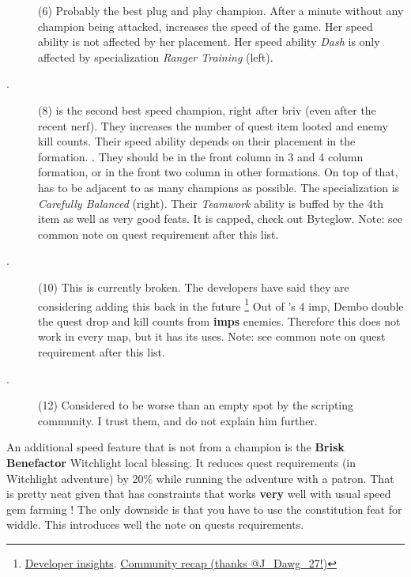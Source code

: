 \documentclass{article}
\begin{document}
\begin{description}
    \item[\shandie] (6) Probably the best plug and play champion.
    After a minute without any champion being attacked, \shandie increases the speed of the game.
    Her speed ability is not affected by her placement.
    Her speed ability \textit{Dash} is only affected by specialization \textit{Ranger Training} (left).
    
    \item[\hewmaan.] (8) \hewmaan is the second best speed champion, right after briv (even after the recent nerf).
    They increases the number of quest item looted and enemy kill counts.
    Their speed ability depends on their placement in the formation.
    \hewmaan.
    They should be in the front column in 3 and 4 column formation, or in the front two column in other formations.
    On top of that, \hewmaan has to be adjacent to as many champions as possible.
    The specialization is \textit{Carefully Balanced} (right).
    Their \textit{Teamwork} ability is buffed by the 4th item as well as very good feats.
    It is capped, check out Byteglow.
    Note: see common note on quest requirement after this list.
    \item[\havilar.] (10) This is currently broken.
    The developers have said they are considering adding this back in the future \footnote{ \href{https://www.twitch.tv/videos/1538716891}{Developer insights}.
     \href{https://discord.com/channels/357247482247380994/357247483111276546/999801304639602718}{Community recap (thanks @J\_Dawg\_27!)}}
    Out of \havilar's 4 imp, Dembo double the quest drop and kill counts from \textbf{imps} enemies.
    Therefore this does not work in every map, but it has its uses.
    Note: see common note on quest requirement after this list.
    \item[\melf.] (12) Considered to be worse than an empty spot by the scripting community.
    I trust them, and do not explain him further.
\end{description}

An additional speed feature that is not from a champion is the \textbf{Brisk Benefactor} Witchlight local blessing.
It reduces quest requirements (in Witchlight adventure) by 20\% while running the adventure with a patron.
That is pretty neat given that \vjara has constraints that works \textbf{very} well with usual speed gem farming !
The only downside is that you have to use the constitution feat for widdle.
This introduces well the note on quests requirements.
\end{document}
